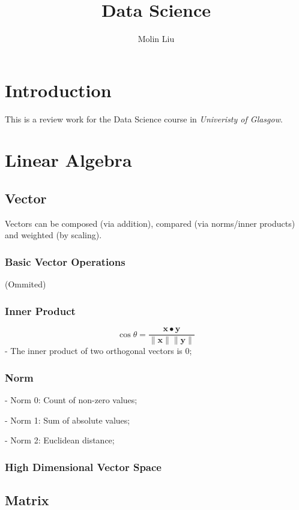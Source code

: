 \documentclass[12pt]{article}
\title{
    Data Science\\
}
\author{Molin Liu}
\begin{document}
\maketitle

\section*{Introduction}

This is a review work for the Data Science course in
\textit{Univeristy of Glasgow}.

\section{Linear Algebra}

\subsection{Vector}
Vectors can be composed (via addition),
compared (via norms/inner products)
and weighted (by scaling).

\subsubsection{Basic Vector Operations}
(Ommited)
\subsubsection{Inner Product}
$$\cos \theta=\frac{\mathbf{x} \bullet \mathbf{y}}{\|\mathbf{x}\|\|\mathbf{y}\|}$$
 - The inner product of two orthogonal vectors is 0;

\subsubsection{Norm}

- Norm 0: Count of non-zero values;

- Norm 1: Sum of absolute values;

- Norm 2: Euclidean distance;   

\subsubsection{High Dimensional Vector Space}

\subsection{Matrix}
\end{document}
